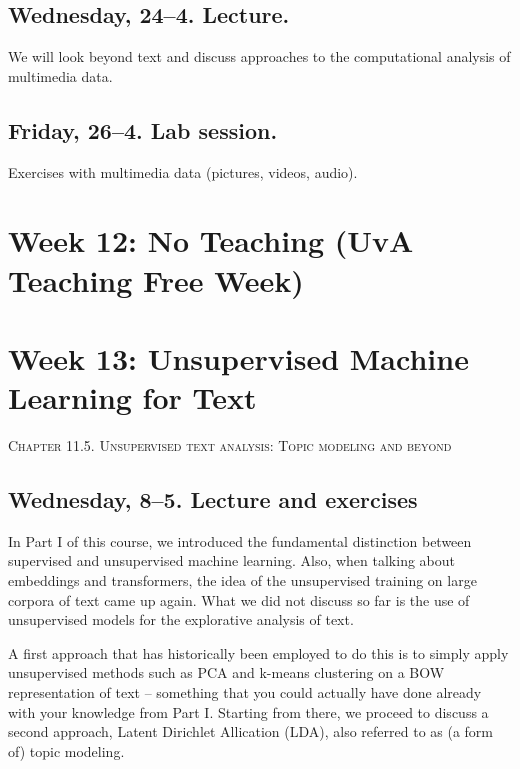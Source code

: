 \subsection*{Wednesday, 24--4. Lecture.}
We will look beyond text and discuss approaches to the computational analysis of multimedia data.


\subsection*{Friday, 26--4. Lab session.}

Exercises with multimedia data (pictures, videos, audio).





\section*{Week 12: No Teaching (UvA Teaching Free Week)}





\section*{Week 13: Unsupervised Machine Learning for Text}
\textsc{ Chapter 11.5. Unsupervised text analysis: Topic modeling and beyond}\\

\subsection*{Wednesday, 8--5. Lecture and exercises}

In Part I of this course, we introduced the fundamental distinction between supervised and unsupervised machine learning. Also, when talking about embeddings and transformers, the idea of the unsupervised training on large corpora of text came up again. What we did not discuss so far is the use of unsupervised models for the explorative analysis of text.

A first approach that has historically been employed to do this is to simply apply unsupervised methods such as PCA and k-means clustering on a BOW representation of text -- something that you could actually have done already with your knowledge from Part I. Starting from there, we proceed to discuss a second approach, Latent Dirichlet Allication (LDA), also referred to as (a form of) topic modeling.


